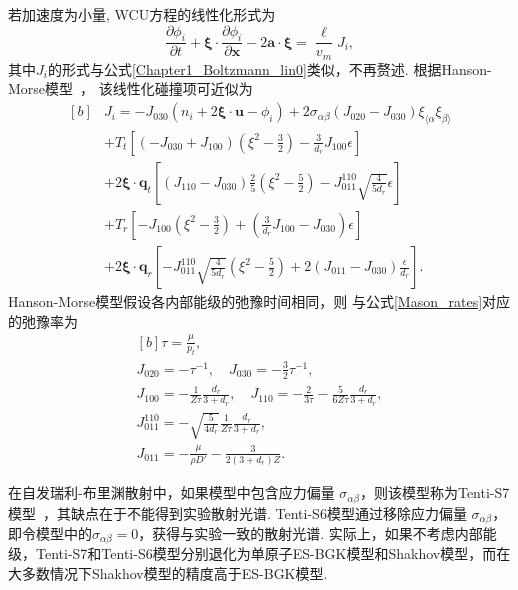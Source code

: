若加速度为小量, WCU方程的线性化形式为
\begin{equation}\label{WCU_lin}
\frac{\partial \phi_i}{\partial{}t}
+{\bm{\xi}}\cdot\frac{\partial
	\phi_i}{\partial \bm{x}}
-2{\bm{a}}\cdot\bm{\xi}=\frac{\ell}{v_m}{J}_i,
\end{equation}
其中${J}_i$的形式与公式\eqref{Chapter1_Boltzmann_lin0}类似，不再赘述. 根据Hanson-Morse模型~\cite{Hanson1967PoF}，
该线性化碰撞项可近似为\cite{Hanson1967PoF}
\begin{equation*}\label{HansonMorese_lin}
\begin{aligned}[b]
&{J}_i=-J_{030}(n_i+2\bm{\xi}\cdot\bm{u}-\phi_i)
+{2\sigma_{\alpha\beta}}(J_{020}-J_{030})
\xi_{\langle \alpha}\xi_{\beta\rangle}\\
&+T_{t}\left[ (-J_{030}+J_{100})\left(\xi^2-\frac{3}{2}\right)-\frac{3}{d_r}J_{100}{\epsilon} \right] \\
&+2\bm{\xi}\cdot\bm{q}_{t}\left[ (J_{110}-J_{030})\frac{2}{5}\left(\xi^2-\frac{5}{2}\right) -J_{011}^{110}\sqrt{\frac{4}{5d_r}}{\epsilon} \right]\\
&+T_{r}\left[ -J_{100}\left(\xi^2-\frac{3}{2}\right) +\left( \frac{3}{d_r}J_{100}-{J}_{030} \right){\epsilon} \right]\\
&+2\bm{\xi}\cdot\bm{q}_{r}\left[ -{J}_{011}^{110}\sqrt{\frac{4}{5d_r}}\left(\xi^2-\frac{5}{2}\right) +2(J_{011}-J_{030})\frac{{\epsilon}}{d_r} \right].
\end{aligned}
\end{equation*}
Hanson-Morse模型假设各内部能级的弛豫时间相同，则
与公式\eqref{Mason_rates}对应的弛豫率为
\begin{equation}\label{coefficient_Hason_Morse}
\begin{aligned}[b]
\tau=\frac{\mu}{p_t}, \\
J_{020}=-\tau^{-1}, \quad
J_{030}=-\frac{3}{2}\tau^{-1},\\
J_{100}=-\frac{1}{Z\tau}\frac{d_r}{3+d_r}, \quad
J_{110}=-\frac{2}{3\tau}-\frac{5}{6Z\tau}\frac{d_r}{3+d_r},\\
J_{011}^{110}=-\sqrt{\frac{5}{4d_r}}\frac{1}{Z\tau}\frac{d_r}{3+d_r}, \\
J_{011}=-\frac{\mu}{\rho{D'}}-\frac{3}{2(3+d_r)Z}.
\end{aligned}
\end{equation}


在自发瑞利-布里渊散射中，如果模型中包含应力偏量 $\sigma_{\alpha\beta}$，则该模型称为Tenti-S7模型~\cite{Boley1972CanJPhys,Tenti1974}，其缺点在于不能得到实验散射光谱. Tenti-S6模型通过移除应力偏量 $\sigma_{\alpha\beta}$，即令模型中的$\sigma_{\alpha\beta}=0$，获得与实验一致的散射光谱. 实际上，如果不考虑内部能级，Tenti-S7和Tenti-S6模型分别退化为单原子ES-BGK模型和Shakhov模型，而在大多数情况下Shakhov模型的精度高于ES-BGK模型.

